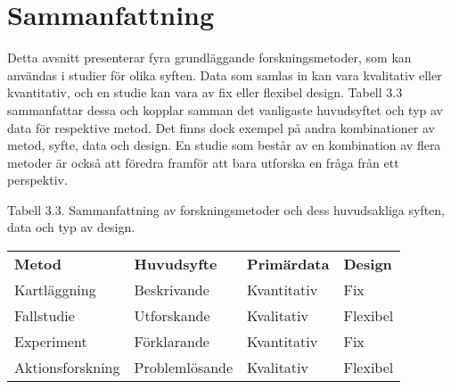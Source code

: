 \section{Sammanfattning}\label{sammanfattning}

Detta avsnitt presenterar fyra grundläggande forskningsmetoder, som kan
användas i studier för olika syften. Data som samlas in kan vara
kvalitativ eller kvantitativ, och en studie kan vara av fix eller
flexibel design. Tabell 3.3 sammanfattar dessa och kopplar samman det
vanligaste huvudsyftet och typ av data för respektive metod. Det finns
dock exempel på andra kombinationer av metod, syfte, data och design. En
studie som består av en kombination av flera metoder är också att
föredra framför att bara utforska en fråga från ett perspektiv.

Tabell 3.3. Sammanfattning av forskningsmetoder och dess huvudsakliga
syften, data och typ av design.

\begin{longtable}[]{@{}llll@{}}
\toprule
\textbf{Metod} & \textbf{Huvudsyfte} & \textbf{Primärdata} &
\textbf{Design}\tabularnewline
Kartläggning & Beskrivande & Kvantitativ & Fix\tabularnewline
Fallstudie & Utforskande & Kvalitativ & Flexibel\tabularnewline
Experiment & Förklarande & Kvantitativ & Fix\tabularnewline
Aktionsforskning & Problemlösande & Kvalitativ & Flexibel\tabularnewline
\bottomrule
\end{longtable}
